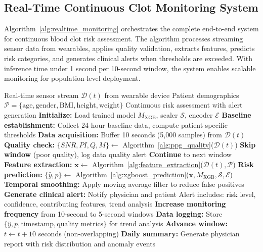 \documentclass[3p,times,procedia]{elsarticle}
\begin{document}
\subsection{Real-Time Continuous Clot Monitoring System}
\vspace{-2pt}

Algorithm~\ref{alg:realtime_monitoring} orchestrates the complete end-to-end system for continuous blood clot risk assessment. The algorithm processes streaming sensor data from wearables, applies quality validation, extracts features, predicts risk categories, and generates clinical alerts when thresholds are exceeded. With inference time under 1 second per 10-second window, the system enables scalable monitoring for population-level deployment.

\begin{algorithm}[H]\footnotesize\setlength{\abovecaptionskip}{-2pt}
\caption{Real-Time Continuous Clot Monitoring}
\label{alg:realtime_monitoring}
\begin{algorithmic}[1]
    \Require Real-time sensor stream $\mathcal{D}(t)$ from wearable device
    \Require Patient demographics $\mathcal{P} = \{\text{age}, \text{gender}, \text{BMI}, \text{height}, \text{weight}\}$
    \Ensure Continuous risk assessment with alert generation
    \State \textbf{Initialize:} Load trained model $M_{\text{XGB}}$, scaler $\mathcal{S}$, encoder $\mathcal{E}$
    \State \textbf{Baseline establishment:} Collect 24-hour baseline data, compute patient-specific thresholds
        \State \textbf{Data acquisition:} Buffer 10 seconds (5,000 samples) from $\mathcal{D}(t)$
        \State \textbf{Quality check:} $\{SNR, PI, Q, M\} \gets$ Algorithm~\ref{alg:ppg_quality}($\mathcal{D}(t)$)
            \State \textbf{Skip window} (poor quality), log data quality alert
            \State \textbf{Continue} to next window
        \EndIf
        \State \textbf{Feature extraction:} $\mathbf{x} \gets$ Algorithm~\ref{alg:feature_extraction}($\mathcal{D}(t), \mathcal{P}$)
        \State \textbf{Risk prediction:} $\{\hat{y}, p\} \gets$ Algorithm~\ref{alg:xgboost_prediction}($\mathbf{x}, M_{\text{XGB}}, \mathcal{S}, \mathcal{E}$)
        \State \textbf{Temporal smoothing:} Apply moving average filter to reduce false positives
            \State \textbf{Generate clinical alert:} Notify physician and patient
            \State \quad Alert includes: risk level, confidence, contributing features, trend analysis
            \State \textbf{Increase monitoring frequency} from 10-second to 5-second windows
        \EndIf
        \State \textbf{Data logging:} Store $\{\hat{y}, p, \text{timestamp}, \text{quality metrics}\}$ for trend analysis
        \State \textbf{Advance window:} $t \gets t + 10$ seconds (non-overlapping)
    \EndWhile
    \State \textbf{Daily summary:} Generate physician report with risk distribution and anomaly events
\end{algorithmic}
\end{algorithm}
\end{document}
